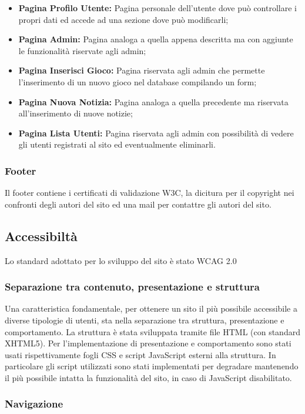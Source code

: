 \begin{itemize}
	\item \textbf{Pagina Profilo Utente:} Pagina personale dell'utente dove può controllare i propri dati ed accede ad una sezione dove può modificarli;
	\item \textbf{Pagina Admin:} Pagina analoga a quella appena descritta ma con aggiunte le funzionalità riservate agli admin;
	\item \textbf{Pagina Inserisci Gioco:} Pagina riservata agli admin che permette l'inserimento di un nuovo gioco nel database compilando un form;
	\item \textbf{Pagina Nuova Notizia:} Pagina analoga a quella precedente ma riservata all'inserimento di nuove notizie;
	\item \textbf{Pagina Lista Utenti:} Pagina riservata agli admin con possibilità di vedere gli utenti registrati al sito ed eventualmente eliminarli.
\end{itemize}

\subsubsection{Footer}
Il footer contiene i certificati di validazione W3C,  la dicitura per il copyright nei confronti degli autori del sito ed una mail per contattre gli autori del sito.



\subsection{Accessibiltà}
Lo standard adottato per lo sviluppo del sito è stato WCAG 2.0

\subsubsection{Separazione tra contenuto, presentazione e struttura}
Una caratteristica fondamentale, per ottenere un sito il più possibile accessibile a diverse tipologie di utenti, sta nella separazione tra struttura, presentazione e comportamento. La struttura è stata sviluppata tramite file HTML (con standard XHTML5). Per l'implementazione di presentazione e comportamento sono stati usati rispettivamente fogli CSS e script JavaScript esterni alla struttura. In particolare gli script utilizzati sono stati implementati per degradare mantenendo il più possibile intatta la funzionalità del sito, in caso di JavaScript disabilitato.   

\subsubsection{Navigazione}

